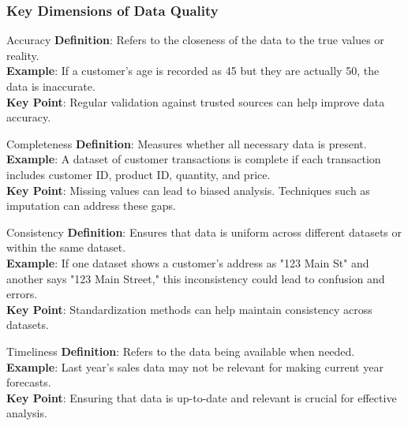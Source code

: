 \documentclass[aspectratio=169]{beamer}
\begin{document}
\begin{frame}[fragile]
    \frametitle{Key Dimensions of Data Quality}
    \begin{block}{Accuracy}
        \textbf{Definition}: Refers to the closeness of the data to the true values or reality. \\
        \textbf{Example}: If a customer's age is recorded as 45 but they are actually 50, the data is inaccurate. \\
        \textbf{Key Point}: Regular validation against trusted sources can help improve data accuracy.
    \end{block}
    
    \begin{block}{Completeness}
        \textbf{Definition}: Measures whether all necessary data is present. \\
        \textbf{Example}: A dataset of customer transactions is complete if each transaction includes customer ID, product ID, quantity, and price. \\
        \textbf{Key Point}: Missing values can lead to biased analysis. Techniques such as imputation can address these gaps.
    \end{block}

    \begin{block}{Consistency}
        \textbf{Definition}: Ensures that data is uniform across different datasets or within the same dataset. \\
        \textbf{Example}: If one dataset shows a customer's address as "123 Main St" and another says "123 Main Street," this inconsistency could lead to confusion and errors. \\
        \textbf{Key Point}: Standardization methods can help maintain consistency across datasets.
    \end{block}

    \begin{block}{Timeliness}
        \textbf{Definition}: Refers to the data being available when needed. \\
        \textbf{Example}: Last year's sales data may not be relevant for making current year forecasts. \\
        \textbf{Key Point}: Ensuring that data is up-to-date and relevant is crucial for effective analysis.
    \end{block}
\end{frame}
\end{document}
